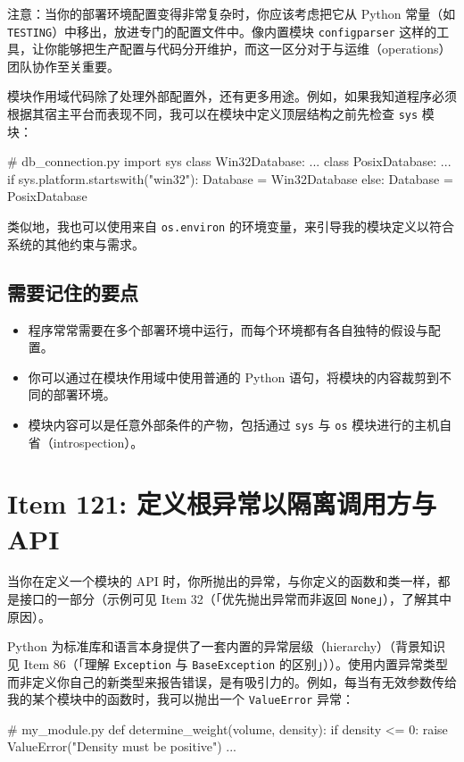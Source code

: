 注意：当你的部署环境配置变得非常复杂时，你应该考虑把它从 Python 常量（如 \texttt{TESTING}）中移出，放进专门的配置文件中。像内置模块 \texttt{configparser} 这样的工具，让你能够把生产配置与代码分开维护，而这一区分对于与运维（operations）团队协作至关重要。

模块作用域代码除了处理外部配置外，还有更多用途。例如，如果我知道程序必须根据其宿主平台而表现不同，我可以在模块中定义顶层结构之前先检查 \texttt{sys} 模块：

\begin{codebox}[python]
# db_connection.py
import sys
class Win32Database:
    ...
class PosixDatabase:
    ...
if sys.platform.startswith("win32"):
    Database = Win32Database
else:
    Database = PosixDatabase
\end{codebox}

类似地，我也可以使用来自 \texttt{os.environ} 的环境变量，来引导我的模块定义以符合系统的其他约束与需求。

\subsection{需要记住的要点}

\begin{itemize}
\item 程序常常需要在多个部署环境中运行，而每个环境都有各自独特的假设与配置。
\item 你可以通过在模块作用域中使用普通的 Python 语句，将模块的内容裁剪到不同的部署环境。
\item 模块内容可以是任意外部条件的产物，包括通过 \texttt{sys} 与 \texttt{os} 模块进行的主机自省（introspection）。
\end{itemize}

\section{Item 121: 定义根异常以隔离调用方与 API}

当你在定义一个模块的 API 时，你所抛出的异常，与你定义的函数和类一样，都是接口的一部分（示例可见 Item 32（「优先抛出异常而非返回 \texttt{None}」），了解其中原因）。

Python 为标准库和语言本身提供了一套内置的异常层级（hierarchy）（背景知识见 Item 86（「理解 \texttt{Exception} 与 \texttt{BaseException} 的区别」））。使用内置异常类型而非定义你自己的新类型来报告错误，是有吸引力的。例如，每当有无效参数传给我的某个模块中的函数时，我可以抛出一个 \texttt{ValueError} 异常：

\begin{codebox}[python]
# my_module.py
def determine_weight(volume, density):
    if density <= 0:
        raise ValueError("Density must be positive")
    ...
\end{codebox}

